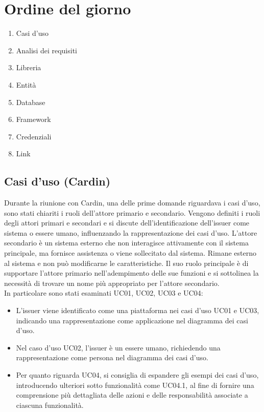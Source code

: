 \section{Ordine del giorno}
\begin{enumerate}
\item Casi d'uso
\item Analisi dei requisiti
\item Libreria
\item Entità
\item Database
\item Framework 
\item Credenziali
\item Link
\end{enumerate}


\subsection{Casi d'uso (Cardin)}
Durante la riunione con Cardin, una delle prime domande riguardava i casi d'uso, sono stati chiariti i ruoli dell'attore primario e secondario.
Vengono definiti i ruoli degli attori primari e secondari e si discute dell'identificazione dell'issuer come sistema o essere umano, influenzando la rappresentazione dei casi d'uso.
L'attore secondario è un sistema esterno che non interagisce attivamente con il sistema principale, ma fornisce assistenza o viene sollecitato dal sistema. Rimane esterno al sistema e non può modificarne le caratteristiche. Il suo ruolo principale è di supportare l'attore primario nell'adempimento delle sue funzioni e si sottolinea la necessità di trovare un nome più appropriato per l'attore secondario.
\\In particolare sono stati esaminati UC01, UC02, UC03 e UC04:
\begin{itemize}
  \item L'issuer viene identificato come una piattaforma nei casi d'uso UC01 e UC03, indicando una rappresentazione come applicazione nel diagramma dei casi d'uso. 
  \item Nel caso d'uso UC02, l'issuer è un essere umano, richiedendo una rappresentazione come persona nel diagramma dei casi d'uso.
  \item Per quanto riguarda UC04, si consiglia di espandere gli esempi dei casi d'uso, introducendo ulteriori sotto funzionalità come UC04.1, al fine di fornire una comprensione più dettagliata delle azioni e delle responsabilità associate a ciascuna funzionalità.
\end{itemize}



